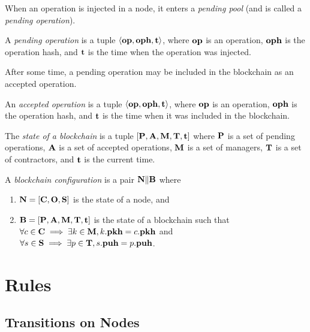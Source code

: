 \documentclass[a4paper]{llncs}
\begin{document}
When an operation is injected in a node, it enters a \emph{pending pool}
(and is called a \emph{pending operation}). 
 \begin{definition}%
A \emph{pending operation} is a tuple  $\langle  \textbf{op}, \textbf{oph}, \textbf{t}
\rangle $, where $\textbf{op}$ is an operation, $\textbf{oph}$ is the operation hash,
and $\textbf{t}$ is the time when the operation was injected. 
\end{definition}
After some time, a pending operation may be included in the blockchain as an accepted operation.
 \begin{definition}%
An \emph{accepted operation}  is a tuple $\langle  \textbf{op}, \textbf{oph}, \textbf{t} \rangle
$, where $\textbf{op}$ is an operation, $\textbf{oph}$ is the operation hash, and
$\textbf{t}$ is the time when it was included in the blockchain. 
\end{definition}

\begin{definition}%
  The \emph{state of a blockchain} is a tuple
  $[\textbf{P}, \textbf{A}, \textbf{M}, \textbf{T}, \textbf{t}]$ where
  $\textbf{P}$ is a set of pending operations,  $\textbf{A}$ is a set
  of accepted operations, $\textbf{M}$ is a set of managers,
  $\textbf{T}$ is a set of contractors, and $\textbf{t}$ is the current time. 
\end{definition}

\begin{definition}%
A \emph{blockchain configuration} is a pair
$ \textbf{N} \| \textbf{B}$ where
\begin{enumerate}
\item $\textbf{N} = [\textbf{C}, \textbf{O}, \textbf{S}]$ is the state of a node, and
\item $\textbf{B} = [\textbf{P}, \textbf{A}, \textbf{M}, \textbf{T}, \textbf{t}]$ is the state of a blockchain 
  such that $\forall c \in \textbf{C} \implies \exists k\in \textbf{M}, k.\textbf{pkh} = c.\textbf{pkh}$
  and $\forall s \in \textbf{S} \implies \exists p \in \textbf{T}, s.\textbf{puh} = p.\textbf{puh}$.
\end{enumerate}
\end{definition}

\clearpage{}
\section{Rules}

\subsection{Transitions on Nodes}
\label{sec:transitions-nodes}
\end{document}
